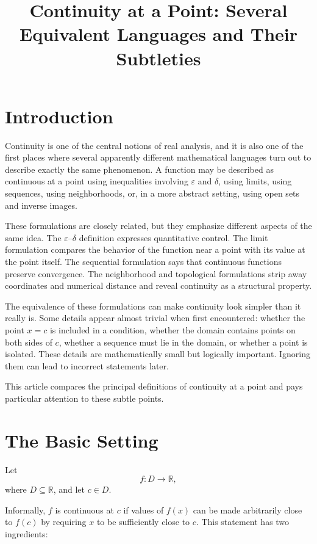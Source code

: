 \documentclass{essay}
\title{Continuity at a Point: Several Equivalent Languages and Their Subtleties}
\author{}
\date{}
\begin{document}
\maketitle

\section{Introduction}

Continuity is one of the central notions of real analysis, and it is also one of the first places where several apparently different mathematical languages turn out to describe exactly the same phenomenon. A function may be described as continuous at a point using inequalities involving \(\varepsilon\) and \(\delta\), using limits, using sequences, using neighborhoods, or, in a more abstract setting, using open sets and inverse images.

These formulations are closely related, but they emphasize different aspects of the same idea. The \(\varepsilon\)--\(\delta\) definition expresses quantitative control. The limit formulation compares the behavior of the function near a point with its value at the point itself. The sequential formulation says that continuous functions preserve convergence. The neighborhood and topological formulations strip away coordinates and numerical distance and reveal continuity as a structural property.

The equivalence of these formulations can make continuity look simpler than it really is. Some details appear almost trivial when first encountered: whether the point \(x=c\) is included in a condition, whether the domain contains points on both sides of \(c\), whether a sequence must lie in the domain, or whether a point is isolated. These details are mathematically small but logically important. Ignoring them can lead to incorrect statements later.

This article compares the principal definitions of continuity at a point and pays particular attention to these subtle points.

\section{The Basic Setting}

Let
\[ f:D\to\mathbb{R}, \]
where \(D\subseteq\mathbb{R}\), and let \(c\in D\).

Informally, \(f\) is continuous at \(c\) if values of \(f(x)\) can be made arbitrarily close to \(f(c)\) by requiring \(x\) to be sufficiently close to \(c\). This statement has two ingredients:
\end{document}
